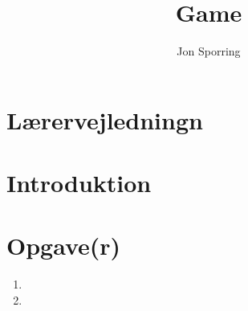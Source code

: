 \documentclass[a4paper,12pt]{article}
\title{Game}
\author{Jon Sporring}
\begin{document}
\maketitle

\section{Lærervejledningn}

\section{Introduktion}

\section{Opgave(r)}
\begin{enumerate}
\item 
\item 
\end{enumerate}
\end{document}
